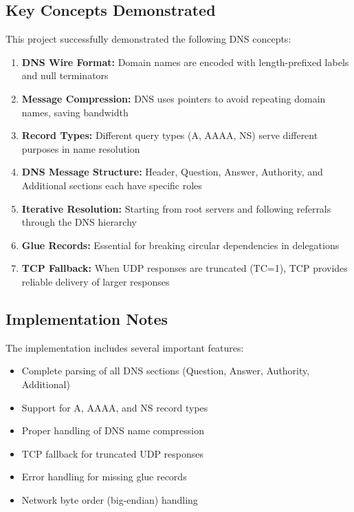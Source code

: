 \documentclass[11pt,letterpaper]{article}
\begin{document}
\subsection{Key Concepts Demonstrated}

This project successfully demonstrated the following DNS concepts:

\begin{enumerate}
    \item \textbf{DNS Wire Format:} Domain names are encoded with length-prefixed labels and null terminators
    \item \textbf{Message Compression:} DNS uses pointers to avoid repeating domain names, saving bandwidth
    \item \textbf{Record Types:} Different query types (A, AAAA, NS) serve different purposes in name resolution
    \item \textbf{DNS Message Structure:} Header, Question, Answer, Authority, and Additional sections each have specific roles
    \item \textbf{Iterative Resolution:} Starting from root servers and following referrals through the DNS hierarchy
    \item \textbf{Glue Records:} Essential for breaking circular dependencies in delegations
    \item \textbf{TCP Fallback:} When UDP responses are truncated (TC=1), TCP provides reliable delivery of larger responses
\end{enumerate}

\subsection{Implementation Notes}

The implementation includes several important features:
\begin{itemize}
    \item Complete parsing of all DNS sections (Question, Answer, Authority, Additional)
    \item Support for A, AAAA, and NS record types
    \item Proper handling of DNS name compression
    \item TCP fallback for truncated UDP responses
    \item Error handling for missing glue records
    \item Network byte order (big-endian) handling
\end{itemize}
\end{document}
